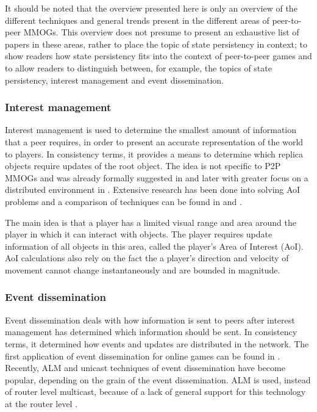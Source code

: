 \documentclass[10pt,a4paper,journal,cspaper,compsoc]{IEEEtran}
\begin{document}
It should be noted that the overview presented here is only an overview of the different techniques and general trends present in the different areas
of peer-to-peer MMOGs. This overview does not presume to present an exhaustive list of papers in these areas, rather to place the topic of state
persistency in context; to show readers how state persistency fits into the context of peer-to-peer games and to allow readers to distinguish
between, for example, the topics of state persistency, interest management and event dissemination.

\subsubsection{Interest management}
\label{key_challenges_im}

Interest management is used to determine the smallest amount of information that a peer requires, in order to present an accurate representation of
the world to players. In consistency terms, it provides a means to determine which replica objects require updates of the root object. The idea is
not specific to P2P MMOGs and was already formally suggested in \cite{First_IM} and later with greater focus on a distributed environment in
\cite{Whang_agent_based_IM}. Extensive research has been done into solving AoI problems and a comparison of techniques can be found in
\cite{Boulanger_IM_compare} and \cite{IM_and_ED_survey_Krause}.

The main idea is that a player has a limited visual range and area around the player in which it can interact with objects. The player requires
update information of all objects in this area, called the player's Area of Interest (AoI). AoI calculations also rely on the fact the a player's
direction and velocity of movement cannot change instantaneously and are bounded in magnitude.

\subsubsection{Event dissemination}

Event dissemination deals with how information is sent to peers after interest management has determined which information should be sent. In
consistency terms, it determined how events and updates are distributed in the network. The first application of event dissemination for online games
can be found in \cite{first_GED}. Recently, ALM and unicast techniques of event dissemination have become popular, depending on the grain of the
event dissemination. ALM is used, instead of router level multicast, because of a lack of general support for this technology at the router level
\cite{ip_multicast_deployment_issues}.
\end{document}
